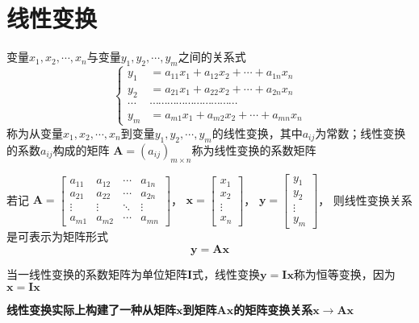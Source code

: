 \documentclass[UTF8]{ctexart}
\newcommand{\ve}[1]{{\bm{#1}}}
\newcommand{\mat}[1]{\ve{#1}}
\begin{document}
\section*{线性变换}
变量$x_1,x_2,\cdots,x_n$与变量$y_1,y_2,\cdots,y_m$之间的关系式
\[\left\{
\begin{aligned}
y_1&=a_{11}x_1+a_{12}x_2+\cdots+a_{1n}x_n\\
y_2&=a_{21}x_1+a_{22}x_2+\cdots+a_{2n}x_n\\
\cdots&\cdots\cdots\cdots\cdots\cdots\cdots\cdots\cdots\cdots\cdots\\
y_m&=a_{m1}x_1+a_{m2}x_2+\cdots+a_{mn}x_n
\end{aligned}
\right.\]
称为从变量$x_1,x_2,\cdots,x_n$到变量$y_1,y_2,\cdots,y_m$的线性变换，其中$a_{ij}$为常数；线性变换的系数$a_{ij}$构成的矩阵
$\mat{A}=(a_{ij})_{m\times n}$称为线性变换的系数矩阵

若记
$\displaystyle\mat{A}=\begin{bmatrix}
a_{11}&a_{12}&\cdots&a_{1n}\\
a_{21}&a_{22}&\cdots&a_{2n}\\
\vdots&\vdots&\ddots&\vdots\\
a_{m1}&a_{m2}&\cdots&a_{mn}
\end{bmatrix}$，
$\displaystyle\mat{x}=\begin{bmatrix}
x_1\\
x_2\\
\vdots\\
x_n
\end{bmatrix}$，
$\displaystyle\mat{y}=\begin{bmatrix}
y_1\\
y_2\\
\vdots\\
y_m
\end{bmatrix}$，
则线性变换关系是可表示为矩阵形式
\[\mat{y}=\mat{A}\mat{x}\]

当一线性变换的系数矩阵为单位矩阵$\mat{I}$式，线性变换$\mat{y}=\mat{I}\mat{x}$称为恒等变换，因为$\mat{x}=\mat{I}\mat{x}$

\textbf{线性变换实际上构建了一种从矩阵$\mat{x}$到矩阵$\mat{A}\mat{x}$的矩阵变换关系$\mat{x}\to\mat{A}\mat{x}$}
\end{document}
